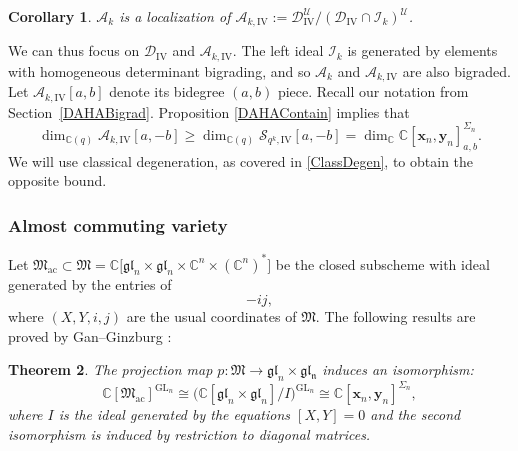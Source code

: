 \documentclass[JEP,XML,SOM,Unicode,published]{cedram}
\newcommand{\GL}{\mathrm{GL}}
\newtheorem{thm}{Theorem}[section]
\newtheorem{cor}[thm]{Corollary}
\theoremstyle{definition}
\newcommand{\CC}{\mathbb{C}}
\newcommand{\UU}{\mathcal{U}}
\newcommand{\DD}{\mathcal{D}}
\newcommand{\AAA}{\mathcal{A}}
\begin{document}
\begin{cor}\label{ALocCor}
$\AAA_k$ is a localization of $\AAA_{k,\mathrm{IV}}:=\DD_{\mathrm{IV}}^\UU\big/(\DD_{\mathrm{IV}}\cap\mathcal{I}_k)^\UU$.
\end{cor}

We can thus focus on $\mathcal{D}_{\mathrm{IV}}$ and $\AAA_{k,\mathrm{IV}}$.
The left ideal $\mathcal{I}_k$ is generated by elements with homogeneous determinant bigrading, and so $\AAA_k$ and $\AAA_{k,\mathrm{IV}}$ are also bigraded.
Let $\AAA_{k,\mathrm{IV}}[a,b]$ denote its bidegree $(a,b)$ piece.
Recall our notation from Section~\ref{DAHABigrad}.
Proposition \ref{DAHAContain} implies that
\begin{equation}
\dim_{\CC(q)}\AAA_{k,\mathrm{IV}}[a,-b]\ge\dim_{\CC(q)}\mathcal{S}_{q^k,\mathrm{IV}}[a,-b]=\dim_\CC\CC\left[ \boldsymbol{x}_n,\boldsymbol{y}_n \right]^{\Sigma_n}_{a,b}.
\label{ABig}
\end{equation}
We will use classical degeneration, as covered in \ref{ClassDegen}, to obtain the opposite bound.

\subsubsection{Almost commuting variety}
Let $\mathfrak{M}_{\mathrm{ac}}\subset\mathfrak{M}=\CC\bigl[\mathfrak{gl}_n\times\mathfrak{gl}_n\times\CC^n\times(\CC^n)^*\bigr]$ be the closed subscheme with ideal generated by the entries of
\begin{equation}
[X,Y]-ij,
\label{ACEquation}
\end{equation}
where $(X,Y,i,j)$ are the usual coordinates of $\mathfrak{M}$.
The following results are proved by Gan--Ginzburg \cite{GanGinz}:
\begin{thm}
The projection map $p:\mathfrak{M}\to\mathfrak{gl}_n\times\mathfrak{gl_n}$ induces an isomorphism:
\begin{equation}
\CC[\mathfrak{M}_{\mathrm{ac}}]^{\GL_n}\cong\bigl(\CC[\mathfrak{gl}_n\times\mathfrak{gl}_n]\big/I\bigr)^{\GL_n}
\cong \CC[\boldsymbol{x}_n,\boldsymbol{y}_n]^{\Sigma_n},
\label{ACIso}
\end{equation}
where $I$ is the ideal generated by the equations $[X,Y]=0$ and the second isomorphism is induced by restriction to diagonal matrices.
\end{thm}
\end{document}
